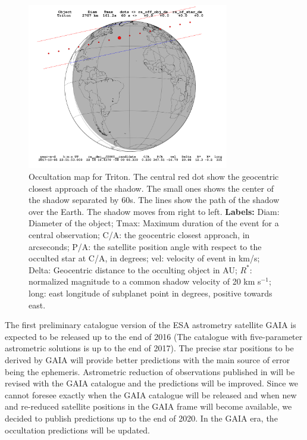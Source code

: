 \documentclass[useAMS,usenatbib]{mn2e}
\begin{document}
\begin{figure}
\begin{centering}
\includegraphics[width = 8.8cm]{figures/Triton_2017-10-05T23:51:53.png}   
\caption{Occultation map for Triton.%
The central red dot show the geocentric closest approach of the shadow. The small ones shows the center of the shadow separated by 60s. The lines show the path of the shadow over the Earth. The shadow moves from right to left.
\textbf{Labels:} Diam: Diameter of the object; Tmax: Maximum duration of the event for a central observation; C/A: the geocentric closest approach, in arcseconds; P/A: the satellite position angle with respect to the occulted star at C/A, in degrees; vel: velocity of event in km/s; Delta: Geocentric distance to the occulting object in AU; $R^*$: normalized magnitude to a common shadow velocity of 20 km s$^{-1}$; long: east longitude of subplanet point in degrees, positive towards east.}
\label{Fig: ocultacao}
\end{centering}
\end{figure}

The first preliminary catalogue version of the ESA astrometry satellite GAIA \citep{deBruijne2012} is expected to be released up to the end of 2016 (The catalogue with five-parameter astrometric solutions is up to the end of 2017). The precise star positions to be derived by GAIA will provide better predictions with the main source of error being the ephemeris. Astrometric reduction of observations published in \cite{GomesJunior2015} will be revised with the GAIA catalogue and the predictions will be improved. Since we cannot foresee exactly when the GAIA catalogue will be released and when new and re-reduced satellite positions in the GAIA frame will become available, we decided to publish predictions up to the end of 2020. In the GAIA era, the occultation predictions will be updated.
\end{document}
